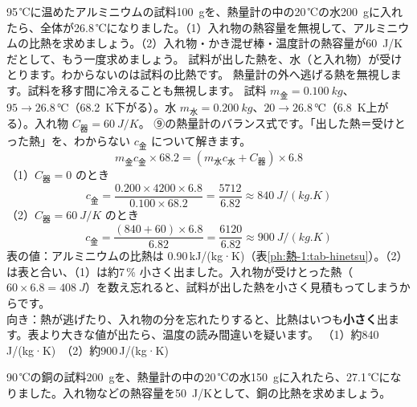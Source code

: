 \label{ph:熱-1:ex5}
\begin{phreidai}[熱量計でアルミニウムの比熱を測る]
95\,℃に温めたアルミニウムの試料\qty{100}{g}を、熱量計の中の20\,℃の水\qty{200}{g}に入れたら、全体が26.8\,℃になりました。（1）入れ物の熱容量を無視して、アルミニウムの比熱を求めましょう。（2）入れ物・かき混ぜ棒・温度計の熱容量が\qty{60}{J/K}だとして、もう一度求めましょう。
\phbamen
試料が出した熱を、水（と入れ物）が受けとります。わからないのは試料の比熱です。
\phmushi
熱量計の外へ逃げる熱を無視します。試料を移す間に冷えることも無視します。
\phzu
試料 $m_{\text{金}}=\qty{0.100}{kg}$、$95\to26.8\,℃$（\qty{68.2}{K}下がる）。水 $m_{\text{水}}=\qty{0.200}{kg}$、$20\to26.8\,℃$（\qty{6.8}{K}上がる）。入れ物 $C_{\text{器}}=\qty{60}{J/K}$。
\phriyu
⑨の熱量計のバランス式です。「出した熱＝受けとった熱」を、わからない $c_{\text{金}}$ について解きます。
\phtateru
\[m_{\text{金}}c_{\text{金}}\times68.2=(m_{\text{水}}c_{\text{水}}+C_{\text{器}})\times6.8\]
\phtoku
（1）$C_{\text{器}}=0$ のとき
\[c_{\text{金}}=\frac{0.200\times4200\times6.8}{0.100\times68.2}=\frac{5712}{6.82}\approx\qty{840}{J/(kg.K)}\]
（2）$C_{\text{器}}=\qty{60}{J/K}$ のとき
\[c_{\text{金}}=\frac{(840+60)\times6.8}{6.82}=\frac{6120}{6.82}\approx\qty{900}{J/(kg.K)}\]
\phtashikame
表の値：アルミニウムの比熱は 0.90\,kJ/(kg·K)（表\ref{ph:熱-1:tab-hinetsu}）。（2）は表と合い、（1）は約7\,\% 小さく出ました。入れ物が受けとった熱（$60\times6.8=\qty{408}{J}$）を数え忘れると、試料が出した熱を小さく見積もってしまうからです。\\
向き：熱が逃げたり、入れ物の分を忘れたりすると、比熱はいつも\textbf{小さく}出ます。表より大きな値が出たら、温度の読み間違いを疑います。
\kotae （1）約840\,J/(kg·K)　（2）約900\,J/(kg·K)
\end{phreidai}
\begin{jibun}
90\,℃の銅の試料\qty{200}{g}を、熱量計の中の20\,℃の水\qty{150}{g}に入れたら、27.1\,℃になりました。入れ物などの熱容量を\qty{50}{J/K}として、銅の比熱を求めましょう。
\end{jibun}

